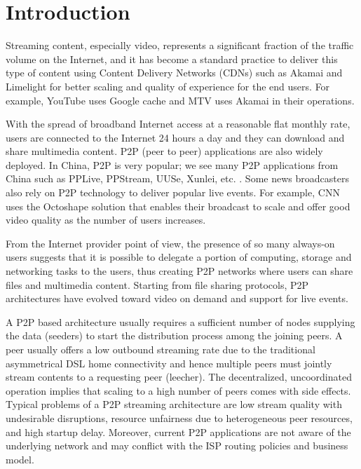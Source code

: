 \documentclass[10pt,final,journal,a4paper]{IEEEtran}
\begin{document}
\section{Introduction}
Streaming content, especially video, represents a significant fraction of the traffic volume on the Internet, and it has become a standard practice to deliver this type of content using Content Delivery Networks (CDNs) such as Akamai and Limelight for better scaling and quality of experience for the end users. 
For example, YouTube uses Google cache and MTV uses Akamai in their operations.

With the spread of broadband Internet access at a reasonable flat monthly rate, users are connected to the Internet 24 hours a day and they can download and share multimedia content. P2P (peer to peer) applications are also widely deployed. 
In China, P2P is very popular; we see many P2P applications from China such as PPLive, PPStream, UUSe, Xunlei, etc. \cite{Vu:2010:UOC:1865106.1865115}. 
Some news broadcasters also rely on P2P technology to deliver popular live events. 
For example, CNN uses the Octoshape \cite{octoshape} solution that enables their broadcast to scale and offer good video quality as the number of users increases.

From the Internet provider point of view, the presence of so many always-on users suggests that it is possible to delegate a portion of computing, storage and networking tasks to the users, thus creating P2P networks where users can share files and multimedia content. 
Starting from file sharing protocols, P2P architectures have evolved toward video on demand and support for live events.

A P2P based architecture usually requires a sufficient number of nodes supplying the data (seeders) to start the distribution process among the joining peers.  
A peer usually offers a low outbound streaming rate due to the traditional asymmetrical DSL home connectivity and hence multiple peers must jointly stream contents to a requesting peer (leecher).  
The decentralized, uncoordinated operation implies that scaling to a high number of peers comes with side effects.  
Typical problems of a P2P streaming architecture are low stream quality with undesirable disruptions, resource unfairness due to heterogeneous peer resources, and high startup delay.  
Moreover, current P2P applications are not aware of the underlying network and may conflict with the ISP routing policies and business model.
\end{document}
